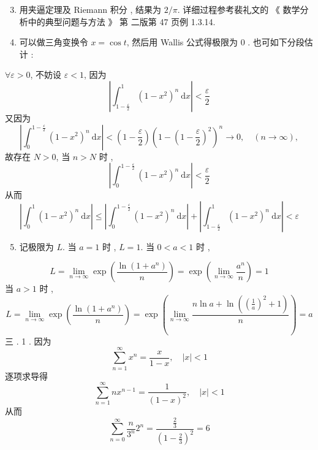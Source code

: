 \documentclass[10pt]{article}
\begin{document}
\begin{enumerate}
  \setcounter{enumi}{2}
  \item  用夹逼定理及  Riemann  积分 ,  结果为  $2 / \pi$.  详细过程参考裴礼文的 《 数学分析中的典型问题与方法 》 第   二版第  47  页例  1.3.14.

  \item  可以做三角变换令  $x=\cos t$,  然后用  Wallis  公式得极限为  0 .  也可如下分段估计 :

\end{enumerate}
$\forall \varepsilon>0$,  不妨设  $\varepsilon<1$,  因为 
$$
\left|\int_{1-\frac{\varepsilon}{2}}^{1}\left(1-x^{2}\right)^{n} \mathrm{~d} x\right|<\frac{\varepsilon}{2}
$$
 又因为 
$$
\left|\int_{0}^{1-\frac{\varepsilon}{2}}\left(1-x^{2}\right)^{n} \mathrm{~d} x\right|<\left(1-\frac{\varepsilon}{2}\right)\left(1-\left(1-\frac{\varepsilon}{2}\right)^{2}\right)^{n} \rightarrow 0, \quad(n \rightarrow \infty),
$$
 故存在  $N>0$,  当  $n>N$  时 ,
$$
\left|\int_{0}^{1-\frac{\varepsilon}{2}}\left(1-x^{2}\right)^{n} \mathrm{~d} x\right|<\frac{\varepsilon}{2}
$$
 从而 
$$
\left|\int_{0}^{1}\left(1-x^{2}\right)^{n} \mathrm{~d} x\right| \leq\left|\int_{0}^{1-\frac{\varepsilon}{2}}\left(1-x^{2}\right)^{n} \mathrm{~d} x\right|+\left|\int_{1-\frac{\varepsilon}{2}}^{1}\left(1-x^{2}\right)^{n} \mathrm{~d} x\right|<\varepsilon
$$

\begin{enumerate}
  \setcounter{enumi}{4}
  \item  记极限为  $L$.  当  $a=1$  时 , $L=1$.  当  $0<a<1$  时 ,
\end{enumerate}
$$
L=\lim _{n \rightarrow \infty} \exp \left(\frac{\ln \left(1+a^{n}\right)}{n}\right)=\exp \left(\lim _{n \rightarrow \infty} \frac{a^{n}}{n}\right)=1
$$
 当  $a>1$  时 ,
$$
L=\lim _{n \rightarrow \infty} \exp \left(\frac{\ln \left(1+a^{n}\right)}{n}\right)=\exp \left(\lim _{n \rightarrow \infty} \frac{n \ln a+\ln \left(\left(\frac{1}{a}\right)^{2}+1\right)}{n}\right)=a
$$
 三 . 1 .  因为 
$$
\sum_{n=1}^{\infty} x^{n}=\frac{x}{1-x}, \quad|x|<1
$$
 逐项求导得 
$$
\sum_{n=1}^{\infty} n x^{n-1}=\frac{1}{(1-x)^{2}}, \quad|x|<1
$$
 从而 
$$
\sum_{n=0}^{\infty} \frac{n}{3^{n}} 2^{n}=\frac{\frac{2}{3}}{\left(1-\frac{2}{3}\right)^{2}}=6
$$
\end{document}
